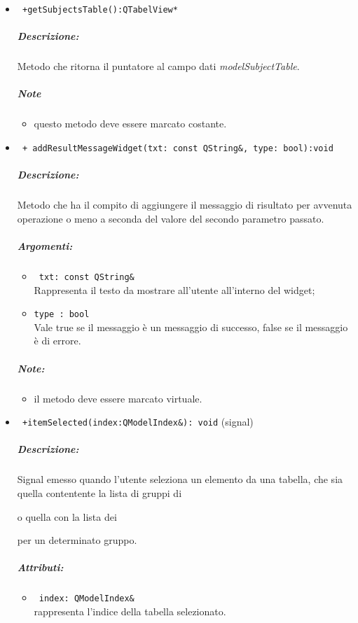 \begin{itemize}
\item\color{blue}\verb! +getSubjectsTable():QTabelView*!
\color{black}
\subparagraph{Descrizione:}Metodo che ritorna il puntatore al campo dati \emph{modelSubjectTable}.
 \subparagraph{Note}
 \begin{itemize}
 \item questo metodo deve essere marcato costante.
 \end{itemize}
\item \color{blue} \verb! + addResultMessageWidget(txt: const QString&, type: bool):void! 
\color{black}
\subparagraph{Descrizione:} Metodo che ha il compito di aggiungere il messaggio di risultato per avvenuta operazione o meno a seconda del valore del secondo parametro passato.
\subparagraph{Argomenti:}
\begin{itemize}
\item \color{RoyalPurple} \verb! txt: const QString& ! \\Rappresenta il testo da mostrare all'utente all'interno del widget;
\item \color{RoyalPurple} \verb!type : bool ! \\ Vale true se il messaggio è un messaggio di successo, false se il messaggio è di errore.
\end{itemize}
\subparagraph{Note:}
\begin{itemize}
\item il metodo deve essere marcato virtuale.
\end{itemize}

\item\color{blue}\verb! +itemSelected(index:QModelIndex&): void! (signal)
\color{black} 
\subparagraph{Descrizione:}
Signal\g{} emesso quando l'utente seleziona un elemento da una tabella, che sia quella contentente la lista di gruppi di \subject{} o quella con la lista dei \subject{} per un determinato gruppo.
\subparagraph{Attributi:}
\begin{itemize}
\item \color{RoyalPurple}\verb! index: QModelIndex& ! \\ rappresenta l'indice della tabella selezionato.
\end{itemize}
\end{itemize}
\pagebreak
\color{black}
